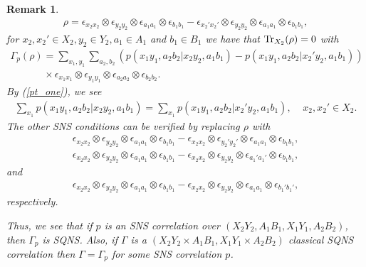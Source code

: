 \documentclass[11pt]{amsart}
\newtheorem{remark}[theorem]{Remark}
\begin{document}
\begin{remark}
\begin{gather*}
	\rho = \epsilon_{x_{2}x_{2}}\otimes \epsilon_{y_{2}y_{2}}\otimes \epsilon_{a_{1}a_{1}}\otimes\epsilon_{b_{1}b_{1}}-\epsilon_{x_{2}'x_{2}'}\otimes \epsilon_{y_{2}y_{2}}\otimes \epsilon_{a_{1}a_{1}}\otimes\epsilon_{b_{1}b_{1}},
\end{gather*}
for $x_{2}, x_{2}' \in X_{2}, y_{2} \in Y_{2}, a_{1} \in A_{1}$ and $b_{1} \in B_{1}$ we have that ${\rm Tr}_{X_{2}}(\rho) = 0$ with
\begin{gather*}
	\Gamma_{p}(\rho)  = \sum\limits_{x_{1}, y_{1}}\sum\limits_{a_{2}, b_{2}}(p(x_{1}y_{1}, a_{2}b_{2}|x_{2}y_{2}, a_{1}b_{1})-p(x_{1}y_{1}, a_{2}b_{2}|x_{2}'y_{2}, a_{1}b_{1}))\\\;\;\;\;\;\;\;\;\;\;\;\;\times\epsilon_{x_{1}x_{1}}\otimes \epsilon_{y_{1}y_{1}}\otimes \epsilon_{a_{2}a_{2}}\otimes \epsilon_{b_{2}b_{2}}.
\end{gather*}
\noindent By (\ref{pt_one}), we see
\begin{gather*}
	\sum\limits_{x_{1}}p(x_{1}y_{1}, a_{2}b_{2}|x_{2}y_{2}, a_{1}b_{1}) = \sum\limits_{x_{1}}p(x_{1}y_{1}, a_{2}b_{2}|x_{2}'y_{2}, a_{1}b_{1}), \;\;\;\; x_{2}, x_{2}' \in X_{2}.
\end{gather*}
\noindent The other SNS conditions can be verified by replacing $\rho$ with
\begin{gather*}
	\epsilon_{x_{2}x_{2}}\otimes \epsilon_{y_{2}y_{2}}\otimes \epsilon_{a_{1}a_{1}}\otimes\epsilon_{b_{1}b_{1}}-\epsilon_{x_{2}x_{2}}\otimes \epsilon_{y_{2}'y_{2}'}\otimes \epsilon_{a_{1}a_{1}}\otimes\epsilon_{b_{1}b_{1}}, \\
	\epsilon_{x_{2}x_{2}}\otimes \epsilon_{y_{2}y_{2}}\otimes \epsilon_{a_{1}a_{1}}\otimes\epsilon_{b_{1}b_{1}}-\epsilon_{x_{2}x_{2}}\otimes \epsilon_{y_{2}y_{2}}\otimes \epsilon_{a_{1}'a_{1}'}\otimes\epsilon_{b_{1}b_{1}},
\end{gather*}
\noindent and
\begin{gather*}
	\epsilon_{x_{2}x_{2}}\otimes \epsilon_{y_{2}y_{2}}\otimes \epsilon_{a_{1}a_{1}}\otimes\epsilon_{b_{1}b_{1}}-\epsilon_{x_{2}x_{2}}\otimes \epsilon_{y_{2}y_{2}}\otimes \epsilon_{a_{1}a_{1}}\otimes\epsilon_{b_{1}'b_{1}'},
\end{gather*}
respectively. 

Thus, we see that if $p$ is an SNS correlation over $(X_{2}Y_{2}, A_{1}B_{1}, X_{1}Y_{1}, A_{2}B_{2})$, then $\Gamma_{p}$ is SQNS. Also, if $\Gamma$ is a $(X_{2}Y_{2}\times A_{1}B_{1}, X_{1}Y_{1}\times A_{2}B_{2})$ classical SQNS correlation then $\Gamma = \Gamma_{p}$ for some SNS correlation $p$. 
\end{remark}
\end{document}
